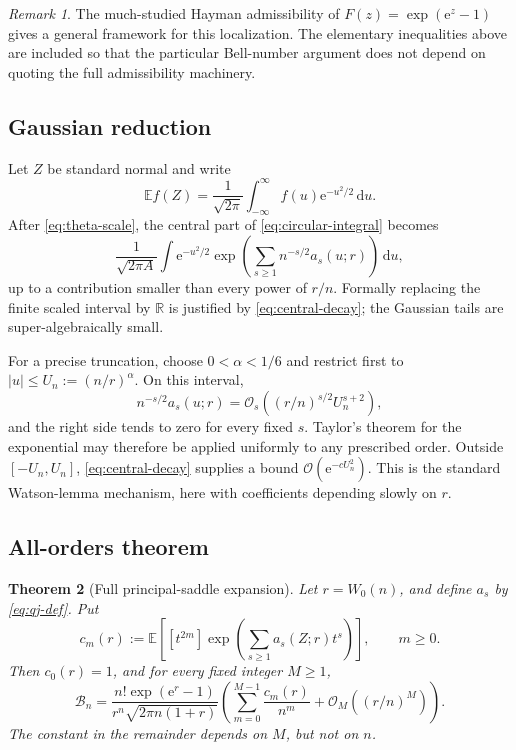 \documentclass[11pt,a4paper]{article}
\newtheorem{theorem}{Theorem}[section]
\theoremstyle{definition}
\theoremstyle{remark}
\newtheorem{remark}[theorem]{Remark}
\newcommand{\Bell}{\mathcal B}
\newcommand{\E}{\mathbb E}
\newcommand{\R}{\mathbb R}
\newcommand{\ee}{\mathrm e}
\newcommand{\dd}{\,\mathrm d}
\newcommand{\BigO}{\mathcal O}
\newcommand{\coef}[2]{[#1^{#2}]}
\begin{document}
\begin{remark}
The much-studied Hayman admissibility of \(F(z)=\exp(\ee^z-1)\) gives a general
framework for this localization.  The elementary inequalities above are included
so that the particular Bell-number argument does not depend on quoting the full
admissibility machinery.
\end{remark}

\subsection{Gaussian reduction}

Let \(Z\) be standard normal and write
\[
  \E f(Z)=\frac1{\sqrt{2\pi}}
          \int_{-\infty}^{\infty}f(u)\ee^{-u^2/2}\dd u.
\]
After \cref{eq:theta-scale}, the central part of \cref{eq:circular-integral}
becomes
\begin{equation}\label{eq:gaussian-reduction}
 \frac{1}{\sqrt{2\pi A}}
 \int \ee^{-u^2/2}
 \exp\!\left(\sum_{s\ge1}n^{-s/2}a_s(u;r)\right)\dd u,
\end{equation}
up to a contribution smaller than every power of \(r/n\).  Formally replacing
the finite scaled interval by \(\R\) is justified by
\cref{eq:central-decay}; the Gaussian tails are super-algebraically small.

For a precise truncation, choose \(0<\alpha<1/6\) and restrict first to
\(|u|\le U_n:=(n/r)^\alpha\).  On this interval,
\[
 n^{-s/2}a_s(u;r)
 =\BigO_s\!\left((r/n)^{s/2}U_n^{s+2}\right),
\]
and the right side tends to zero for every fixed \(s\).  Taylor's theorem for
the exponential may therefore be applied uniformly to any prescribed order.
Outside \([-U_n,U_n]\), \cref{eq:central-decay} supplies a bound
\(\BigO(\ee^{-cU_n^2})\).  This is the standard Watson-lemma mechanism, here
with coefficients depending slowly on \(r\).

\subsection{All-orders theorem}

\begin{theorem}[Full principal-saddle expansion]\label{thm:all-orders}
Let \(r=W_0(n)\), and define \(a_s\) by \cref{eq:qj-def}.  Put
\begin{equation}\label{eq:cm-gaussian-def}
 c_m(r):=
 \E\!\left[
   \coef{t}{2m}
   \exp\!\left(\sum_{s\ge1}a_s(Z;r)t^s\right)
 \right],
 \qquad m\ge0.
\end{equation}
Then \(c_0(r)=1\), and for every fixed integer \(M\ge1\),
\begin{equation}\label{eq:all-orders-main}
 \boxed{
 \Bell_n=
 \frac{n!\exp(\ee^r-1)}{r^n\sqrt{2\pi n(1+r)}}
 \left(
   \sum_{m=0}^{M-1}\frac{c_m(r)}{n^m}
   +\BigO_M\!\left((r/n)^M\right)
 \right).}
\end{equation}
The constant in the remainder depends on \(M\), but not on \(n\).
\end{theorem}
\end{document}
